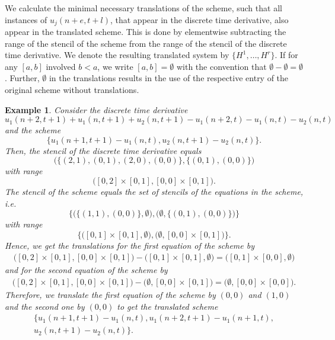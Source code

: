 \documentclass[sigconf,twocolumn]{acmart}
\newcommand{\1}{{\chi}}
\numberwithin{equation}{section}
\theoremstyle{thmlemcorr}
\numberwithin{theorem}{section}
\theoremstyle{thmlemcorr*}
\theoremstyle{defi}
\theoremstyle{remexample}
\newtheorem{example}[theorem]{Example}
\theoremstyle{ass}
\begin{document}
We calculate the minimal necessary translations of the scheme, such that all instances of $u_j(n+e,t+l)$, that appear in the discrete time derivative, also appear in the translated scheme. This is done by elementwise subtracting the range of the stencil of the scheme from the range of the stencil of the discrete time derivative. We denote the resulting translated system by $\{H^1,\ldots,H^r\}$.
If for any $[a,b]$ involved $b<a$, we write $[a,b]=\emptyset$ with the convention that $\emptyset-\emptyset=\emptyset$.  Further, $\emptyset$ in the translations results in the use of the respective entry of the original scheme without translations.
	\begin{example}
		Consider the discrete time derivative
		\begin{equation*}
			u_1(n+2,t+1)+u_1(n,t+1)+u_2(n,t+1)-u_1(n+2,t)-u_1(n,t)-u_2(n,t)
		\end{equation*}
		and the scheme
		\begin{equation*}
			\{u_1(n+1,t+1)-u_1(n,t),u_2(n,t+1)-u_2(n,t)\}.
		\end{equation*}
		Then, the stencil of the discrete time derivative equals 
		\begin{equation*}
			\Big( \big\{ (2,1),(0,1),(2,0),(0,0) \big\},\big\{(0,1),(0,0)\big\} \Big)
		\end{equation*}
		with range
		\begin{equation*}
			\Big([0,2]\times[0,1],[0,0]\times [0,1]\Big).
		\end{equation*}
		The stencil of the scheme equals the set of stencils of the equations in the scheme, i.e.
		\begin{equation*}
			\Bigg\{\Big(\big\{(1,1),(0,0)\big\},\emptyset\Big),\Big(\emptyset,\big\{(0,1),(0,0)\big\}\Big)\Bigg\}
		\end{equation*}
		with range
		\begin{equation*}
			\Bigg\{\Big([0,1]\times[0,1],\emptyset\Big),\Big(\emptyset,[0,0]\times [0,1]\Big)\Bigg\}.
		\end{equation*}
		Hence, we get the translations for the first equation of the scheme by
		\footnotesize
		\begin{gather*}
			\Big([0,2]\times[0,1],[0,0]\times [0,1]\Big)-\Big([0,1]\times[0,1],\emptyset\Big)=\Big([0,1]\times[0,0],\emptyset\Big)
		\end{gather*}
		\normalsize
		and for the second equation of the scheme by
		\footnotesize
		\begin{gather*}
			\Big([0,2]\times[0,1],[0,0]\times [0,1]\Big)-\Big(\emptyset,[0,0]\times [0,1]\Big)=\Big(\emptyset,[0,0]\times [0,0]\Big).
		\end{gather*}
		\normalsize
		Therefore, we translate the first equation of the scheme by $(0,0)$ and $(1,0)$ and the second one by $(0,0)$ to get the translated scheme
		\begin{gather*}
			\{u_1(n+1,t+1)-u_1(n,t),
			u_1(n+2,t+1)-u_1(n+1,t),\\
			u_2(n,t+1)-u_2(n,t)
			\}.
		\end{gather*}
	\end{example}
\end{document}
